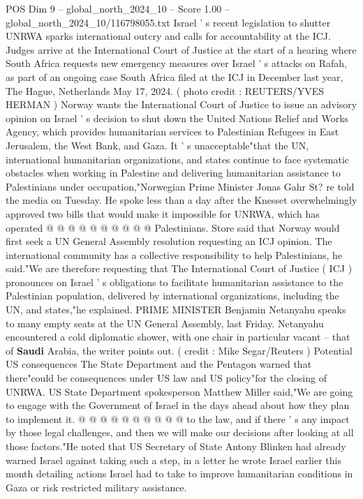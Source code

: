 \begin{textsample}{POS Dim 9 – global\_north\_2024\_10 – Score 1.00 – global\_north\_2024\_10/116798055.txt}  \label{ex:f9_pos_399}
Israel ' s recent legislation to shutter UNRWA sparks international outcry and calls for accountability at the ICJ.
Judges arrive at the International Court of Justice at the start of a hearing where South Africa requests new emergency measures over Israel ' s attacks on Rafah, as part of an ongoing case South Africa filed at the ICJ in December last year, The Hague, Netherlands May 17, 2024. ( photo credit : REUTERS/YVES HERMAN ) Norway wants the International Court of Justice to issue an advisory opinion on Israel ' s decision to shut down the United Nations Relief and Works Agency, which provides humanitarian services to Palestinian Refugees in East Jerusalem, the West Bank, and Gaza.
It ' s unacceptable"that the UN, international humanitarian organizations, and states continue to face systematic obstacles when working in Palestine and delivering humanitarian assistance to Palestinians under occupation,"Norwegian Prime Minister Jonas Gahr St? re told the media on Tuesday.
He spoke less than a day after the Knesset overwhelmingly approved two bills that would make it impossible for UNRWA, which has operated @ @ @ @ @ @ @ @ @ @ Palestinians.
Store said that Norway would first seek a UN General Assembly resolution requesting an ICJ opinion.
The international community has a collective responsibility to help Palestinians, he said."We are therefore requesting that The International Court of Justice ( ICJ ) pronounces on Israel ' s obligations to facilitate humanitarian assistance to the Palestinian population, delivered by international organizations, including the UN, and states,"he explained.
PRIME MINISTER Benjamin Netanyahu speaks to many empty seats at the UN General Assembly, last Friday.
Netanyahu encountered a cold diplomatic shower, with one chair in particular vacant -- that of \textbf{Saudi} Arabia, the writer points out. ( credit : Mike Segar/Reuters ) Potential US consequences The State Department and the Pentagon warned that there"could be consequences under US law and US policy"for the closing of UNRWA.
US State Department spokesperson Matthew Miller said,"We are going to engage with the Government of Israel in the days ahead about how they plan to implement it. @ @ @ @ @ @ @ @ @ @ to the law, and if there ' s any impact by those legal challenges, and then we will make our decisions after looking at all those factors."He noted that US Secretary of State Antony Blinken had already warned Israel against taking such a step, in a letter he wrote Israel earlier this month detailing actions Israel had to take to improve humanitarian conditions in Gaza or risk restricted military assistance.

\end{textsample}

